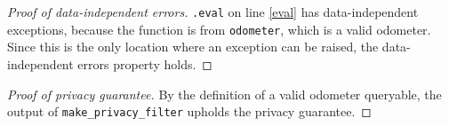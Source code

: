 \documentclass{article}
\begin{document}
\begin{proof}[Proof of data-independent errors]
    \texttt{.eval} on line \ref{eval} has data-independent exceptions,
    because the function is from \texttt{odometer}, which is a valid odometer.
    Since this is the only location where an exception can be raised,
    the data-independent errors property holds.
\end{proof}

\begin{proof}[Proof of privacy guarantee]
    By the definition of a valid odometer queryable, 
    the output of \texttt{make\_privacy\_filter} upholds the privacy guarantee.
\end{proof}
\end{document}
